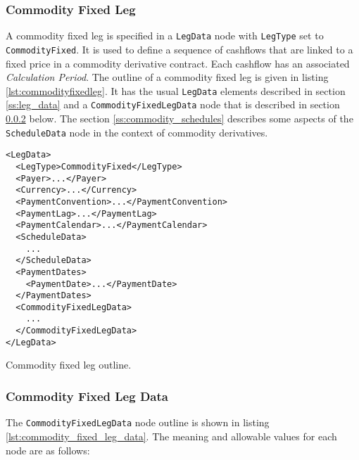 \subsubsection{Commodity Fixed Leg}
\label{ss:commodityfixedleg}

A commodity fixed leg is specified in a \lstinline!LegData! node with \lstinline!LegType! set to \lstinline!CommodityFixed!. It is used to define a sequence of cashflows that are linked to a fixed price in a commodity derivative contract. Each cashflow has an associated \textit{Calculation Period}. The outline of a commodity fixed leg is given in listing \ref{lst:commodityfixedleg}. It has the usual \lstinline!LegData! elements described in section \ref{ss:leg_data} and a \lstinline!CommodityFixedLegData! node that is described in section \ref{ss:commodity_fixed_leg_data} below. The section \ref{ss:commodity_schedules} describes some aspects of the \lstinline!ScheduleData! node in the context of commodity derivatives.

\begin{listing}[h!]
\begin{verbatim}
<LegData>
  <LegType>CommodityFixed</LegType>
  <Payer>...</Payer>
  <Currency>...</Currency>
  <PaymentConvention>...</PaymentConvention>
  <PaymentLag>...</PaymentLag>
  <PaymentCalendar>...</PaymentCalendar>
  <ScheduleData>
    ...
  </ScheduleData>
  <PaymentDates>
    <PaymentDate>...</PaymentDate>
  </PaymentDates>
  <CommodityFixedLegData>
    ...
  </CommodityFixedLegData>
</LegData>
\end{verbatim}
\caption{Commodity fixed leg outline.}
\label{lst:commodityfixedleg}
\end{listing}

\subsubsection{Commodity Fixed Leg Data}
\label{ss:commodity_fixed_leg_data}
The \lstinline!CommodityFixedLegData! node outline is shown in listing \ref{lst:commodity_fixed_leg_data}. The meaning and allowable values for each node are as follows:

